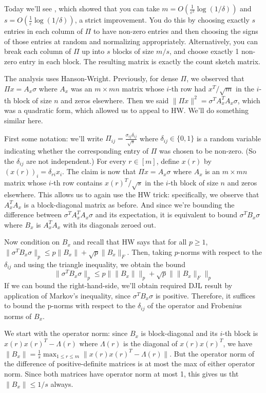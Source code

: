\documentclass[11pt]{article}
\newcommand{\ep}{\varepsilon}
\begin{document}
Today we'll see \cite{KN2014}, which showed that you can take $m = O(\frac{1}{\ep^2} \log(1/\delta))$ and $s = O(\frac{1}{\ep} \log(1/\delta))$, a strict improvement. You do this by choosing exactly $s$ entries in each column of $\Pi$ to have non-zero entries and then choosing the signs of those entries at random and normalizing appropriately. Alternatively, you can break each column of $\Pi$ up into $s$ blocks of size $m/s$, and choose exactly 1 non-zero entry in each block. The resulting matrix is exactly the count sketch matrix.

The analysis uses Hanson-Wright. Previously, for dense $\Pi$, we observed that $\Pi x = A_x \sigma$ where $A_x$ was an $m \times mn$ matrix whose $i$-th row had $x^T / \sqrt{m}$ in the $i$-th block of size $n$ and zeros elsewhere. Then we said $\| \Pi x \|^2 = \sigma^T A_x^T A_x \sigma$, which was a quadratic form, which allowed us to appeal to HW. We'll do something similar here.

First some notation: we'll write $\Pi_{ij} = \frac{\sigma_{ij} \delta_{ij}}{\sqrt{s}}$ where $\delta_{ij} \in \{0,1\}$ is a random variable indicating whether the corresponding entry of $\Pi$ was chosen to be non-zero. (So the $\delta_{ij}$ are not independent.) For every $r \in [m]$, define $x(r)$ by $(x(r))_i = \delta_{ri} x_i$. The claim is now that $\Pi x = A_x \sigma$ where $A_x$ is an $m \times mn$ matrix whose $i$-th row contains $x(r)^T / \sqrt{s}$ in the $i$-th block of size $n$ and zeros elsewhere. This allows us to again use the HW trick: specifically, we observe that $A_x^T A_x$ is a block-diagonal matrix as before. And since we're bounding the difference between $\sigma^T A_x^T A_x \sigma$ and its expectation, it is equivalent to bound $\sigma^T B_x \sigma$ where $B_x$ is $A_x^T A_x$ with its diagonals zeroed out.

Now condition on $B_x$ and recall that HW says that for all $p \geq 1$, $\| \sigma^T B_x \sigma \|_p \leq p \|B_x\| + \sqrt{p} \|B_x\|_F$. Then, taking $p$-norms with respect to the $\delta_{ij}$ and using the triangle inequality, we obtain the bound
\[
\| \sigma^T B_x \sigma \|_p \leq p \| \|B_x\| \|_p + \sqrt{p} \| \|B_x\|_F \|_p
\]
If we can bound the right-hand-side, we'll obtain required DJL result by application of Markov's inequality, since $\sigma^T B_x \sigma$ is positive. Therefore, it suffices to bound the p-norms with respect to the $\delta_{ij}$ of the operator and Frobenius norms of $B_x$.

We start with the operator norm: since $B_x$ is block-diagonal and its $i$-th block is $x(r) x(r)^T - \Lambda(r)$ where $\Lambda(r)$ is the diagonal of $x(r) x(r)^T$, we have $\|B_x \| = \frac{1}{s} \max_{1 \leq r \leq m} \| x(r) x(r)^T - \Lambda(r) \|$. But the operator norm of the difference of positive-definite matrices is at most the max of either operator norm. Since both matrices have operator norm at most 1, this gives us tht $\|B_x\| \leq 1/s$ always.
\end{document}
